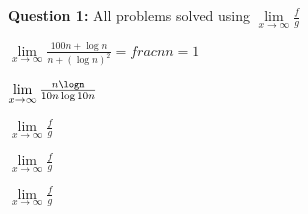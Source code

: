 \textbf{Question 1:}
All problems solved using $\lim \limits_{x \to \infty}{ \frac{f}{g} } $
\begin{list}{:~}{}

\item{ $\lim \limits_{x \to \infty}{ \frac{100n + \log n}{n + (\log n)^2} }=frac{n}{n}=1 $ }

\item $\lim \limits_{x \to \infty}{ \frac{n\logn}{10n\log10n} } $

\item $\lim \limits_{x \to \infty}{ \frac{f}{g} } $
\item $\lim \limits_{x \to \infty}{ \frac{f}{g} }$
\item $\lim \limits_{x \to \infty}{ \frac{f}{g} }$ 
\end{list}